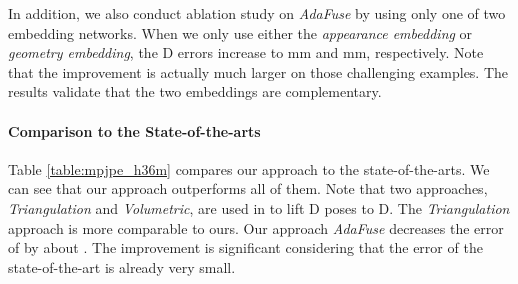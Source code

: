 In addition, we also conduct ablation study on \emph{AdaFuse} by using only one of two embedding networks. When we only use either the \emph{appearance embedding} or \emph{geometry embedding}, the D errors increase to mm and mm, respectively. Note that the improvement is actually much larger on those challenging examples. The results validate that the two embeddings are complementary.




\paragraph{Comparison to the State-of-the-arts}
Table \ref{table:mpjpe_h36m} compares our approach to the state-of-the-arts. We can see that our approach outperforms all of them. Note that two approaches, \ie \emph{Triangulation} and \emph{Volumetric}, are used in \citep{iskakov2019learnable} to lift D poses to D. The \emph{Triangulation} approach is more comparable to ours. Our approach \emph{AdaFuse} decreases the error of \citep{iskakov2019learnable} by about . The improvement is significant considering that the error of the state-of-the-art is already very small.







